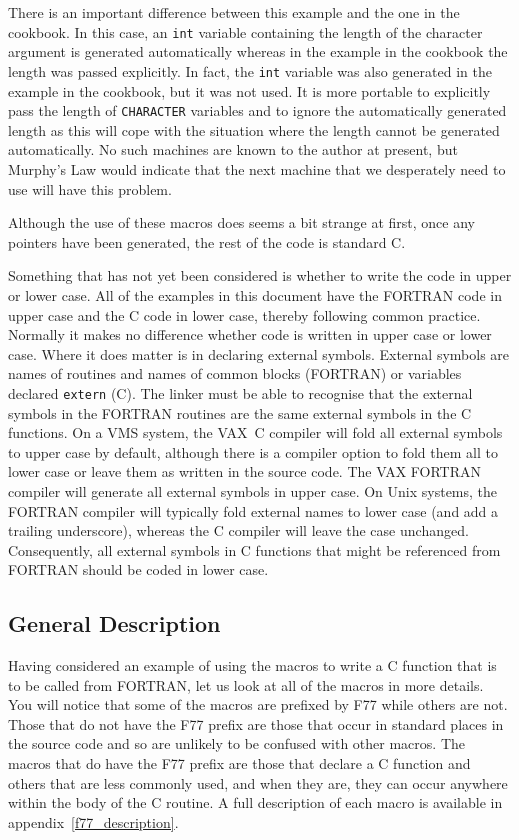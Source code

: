 \documentclass[twoside,11pt]{article}
\newcommand{\htmlref}[2]{#1}
\newcommand{\latex}[1]{#1}
\newcommand{\xlabel}[1]{}
\renewcommand{\_}{\texttt{\symbol{95}}}
\newcounter{examples}
\begin{document}
There is an important difference between this example and the one in the
cookbook. In this case, an \texttt{int} variable containing the length of the
character argument is generated automatically whereas in the example in the
cookbook the length was passed explicitly. 
In fact, the \texttt{int} variable was
also generated in the example in the cookbook, but it was not used. It is more
portable to explicitly pass the length of \texttt{CHARACTER} variables and to 
ignore the automatically generated length as this will cope with the situation 
where the length cannot be generated automatically. 
No such machines are known to the
author at present, but Murphy's Law would indicate that the next machine that
we desperately need to use will have this problem.

Although the use of these macros does seems a bit strange at first, once any
pointers have been generated, the rest of the code is standard C\@.

Something that has not yet been considered is whether to write the code in
upper or lower case. All of the examples in this document have the FORTRAN code
in upper case and the C code in lower case, thereby following common practice.
Normally it makes no difference whether code is written in upper case or lower
case. Where it does matter is in declaring external symbols. External symbols
are names of routines and names of common blocks (FORTRAN) or variables
declared \texttt{extern} (C). The linker must be able to recognise that the
external symbols in the FORTRAN routines are the same external symbols in the C
functions. On a VMS system, the VAX~C compiler will fold all external symbols
to upper case by default, although there is a compiler option to fold them all
to lower case or leave them as written in the source code. The VAX FORTRAN
compiler will generate all external symbols in upper case. On Unix systems, the
FORTRAN compiler will typically fold external names to lower case (and add a
trailing underscore), whereas the C compiler will leave the case unchanged.
Consequently, all external symbols in C functions that might be referenced from
FORTRAN should be coded in lower case.

\subsection{\xlabel{general_description}General Description}

Having considered an example of using the macros to write a C function that is
to be called from FORTRAN, let us look at all of the macros in more details.
You will notice that some of the macros are prefixed by F77 while others are
not. Those that do not have the F77 prefix are those that occur in standard
places in the source code and so are unlikely to be confused with other macros.
The macros that do have the F77 prefix are those that declare a C function and
others that are less commonly used, and when they are, they can occur anywhere
within the body of the C routine. 
A 
\htmlref{full description of each macro}{f77_description} is 
available\latex{ in appendix~\ref{f77_description}}.
\end{document}
